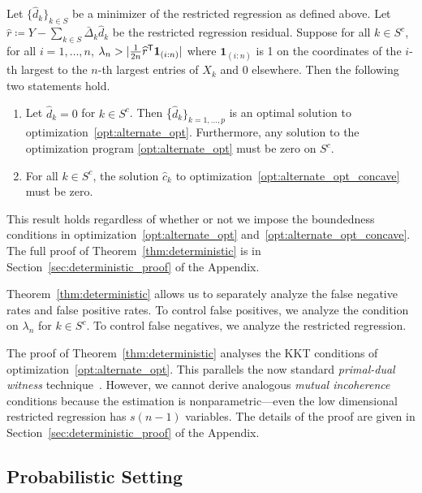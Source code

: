 \begin{theorem}
\label{thm:deterministic}
Let $\{\hat{d}_k \}_{k \in S}$ be a minimizer of the restricted regression as defined above.
Let $\hat{r} \coloneqq Y - \sum_{k \in S} \bar{\Delta}_k \hat{d}_k$ be the restricted regression residual. 
Suppose for all $k\in S^c$, for all $i=1,\ldots,n$, $\lambda_n > | \frac{1}{2n}
\widehat{r}^{\mathsf{T}} \mbox{\boldmath $1$}_{(i:n)}|$ where $\mathbf{1}_{(i:n)}$ is 1 on
the coordinates of the 
$i$-th largest to the $n$-th largest entries of $X_k$ and 0
elsewhere.  Then the following two statements hold.
\begin{enumerate}
\item Let $\hat{d}_k = 0$ for $k \in S^c$.  Then
  \{$\hat{d}_k\}_{k=1,\ldots,p}$ is an optimal solution to
  optimization~\eqref{opt:alternate_opt}. Furthermore, any solution to
  the optimization program \eqref{opt:alternate_opt} must be zero on
  $S^c$.
\item For all $k \in S^c$, the solution $\hat{c}_k$ to optimization~\eqref{opt:alternate_opt_concave} must be zero.
\end{enumerate}

\end{theorem}

This result holds regardless of whether or not we impose the boundedness conditions in optimization~\eqref{opt:alternate_opt} and~\eqref{opt:alternate_opt_concave}.
The full proof of Theorem~\ref{thm:deterministic} is in Section~\ref{sec:deterministic_proof} of the Appendix.

Theorem~\ref{thm:deterministic} allows us to separately analyze the false negative
rates and false positive rates. To control false positives,
we analyze the condition on $\lambda_n$ for $k \in S^c$. To control
false negatives, we analyze the restricted regression. 

The proof of Theorem~\ref{thm:deterministic} analyses the KKT
conditions of optimization~\eqref{opt:alternate_opt}.  This parallels
the now standard \emph{primal-dual witness}
technique~\citep{wainwright2009sharp}. However, we cannot derive analogous
\emph{mutual incoherence} conditions because the estimation is
nonparametric---even the low dimensional restricted regression has
$s(n-1)$ variables. The details of the proof are given in
Section~\ref{sec:deterministic_proof} of the Appendix.

\subsection{Probabilistic Setting}


